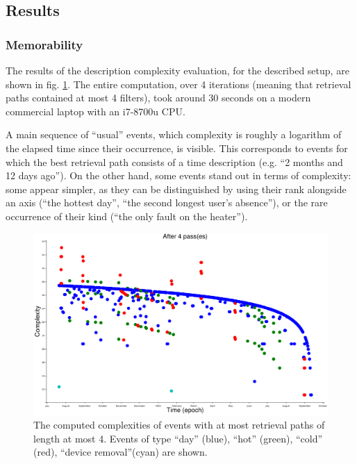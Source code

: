 \documentclass[conference]{IEEEtran}
\begin{document}
\subsection{Results}

\subsubsection{Memorability}

The results of the description complexity evaluation, for the described setup,
are shown in fig. \ref{fig:computed_cplx}. The entire computation, over 4
iterations (meaning that retrieval paths contained at most 4 filters), took
around 30 seconds on a modern commercial laptop with an i7-8700u CPU.

A main sequence of ``usual'' events, which complexity is roughly a logarithm of
the elapsed time since their occurrence, is visible. This corresponds to events
for which the best retrieval path consists of a time description (e.g. ``2
months and 12 days ago''). On the other hand, some events stand out in terms of
complexity: some appear simpler, as they can be distinguished by using their
rank alongside an axis (``the hottest day'', ``the second longest user's
absence''), or the rare occurrence of their kind (``the only fault on the heater'').

\begin{figure}[ht]
  \centering
  \includegraphics[width=\linewidth]{figures/complexities_computed}
  \caption{The computed complexities of events with at most retrieval paths of
    length at most 4. Events of type ``day'' (blue), ``hot'' (green), ``cold''
    (red), ``device removal''(cyan) are shown.}
  \label{fig:computed_cplx}
\end{figure}
\end{document}

